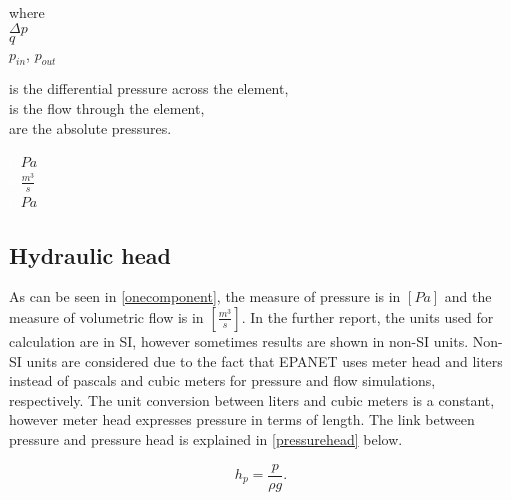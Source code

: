  \begin{minipage}[t]{0.20\textwidth}
where\\
\hspace*{8mm} $\Delta p$ \\
\hspace*{8mm} $q$ \\
\hspace*{8mm} $p_{in}$, $p_{out}$ 
\end{minipage}
\begin{minipage}[t]{0.68\textwidth}
\vspace*{2mm}
is the differential pressure across the element,\\
is the flow through the element,\\
are the absolute pressures.
\end{minipage}
\begin{minipage}[t]{0.10\textwidth}
\vspace*{2mm}
\textcolor{White}{te}$\unit{Pa}$\\
\textcolor{White}{te}$\unit{\frac{m^3}{s}}$\\
\textcolor{White}{te}$\unit{Pa}$
\end{minipage}

\subsection{Hydraulic head}
\label{hydraulic_head}

As can be seen in \eqref{onecomponent}, the measure of pressure is in $[Pa]$ and the measure of volumetric flow is in $[\frac{m^3}{s}]$. In the further report, the units used for calculation are in SI, however sometimes results are shown in non-SI units. Non-SI units are considered due to the fact that EPANET uses meter head and liters instead of pascals and cubic meters for pressure and flow simulations, respectively. The unit conversion between liters and cubic meters is a constant, however meter head expresses pressure in terms of length. The link between pressure and pressure head is explained in \eqref{pressurehead} below. 

\begin{equation}
\label{pressurehead}
  h_p = \frac{p}{\rho g}.
\end{equation} 

